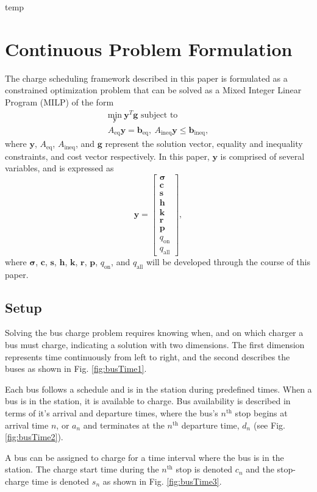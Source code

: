 \newpage temp \newpage
\section{Continuous Problem Formulation}
The charge scheduling framework described in this paper is formulated as a constrained optimization problem that can be solved as a Mixed Integer Linear Program (MILP) of the form
\begin{equation}\begin{matrix}
	\underset{\mathbf{y}}{\text{min}} \ \mathbf{y}^T\mathbf{g} \text{ subject to } \\
	A_{\text{eq}}\mathbf{y} = \mathbf{b}_{\text{eq}}, \ A_{\text{ineq}}\mathbf{y} \le \mathbf{b}_{\text{ineq}},
\end{matrix} \end{equation}
where $\mathbf{y}$, $A_{\text{eq}}$, $A_{\text{ineq}}$, and $\mathbf{g}$ represent the solution vector, equality and inequality constraints, and cost vector respectively. In this paper, $\mathbf{y}$ is comprised of several variables, and is expressed as 
\begin{equation}
	\mathbf{y} = \begin{bmatrix}\mathbf{\sigma} \\ \mathbf{c} \\ \mathbf{s} \\ \mathbf{h} \\ \mathbf{k} \\ \mathbf{r} \\ \mathbf{p} \\ q_{\text{on}} \\ q_{\text{all}}\end{bmatrix},
\end{equation}
where $\mathbf{\sigma}$, $\mathbf{c}$, $\mathbf{s}$, $\mathbf{h}$, $\mathbf{k}$, $\mathbf{r}$, $\mathbf{p}$, $q_{\text{on}}$, and $q_{\text{all}}$ will be developed through the course of this paper.
\subsection{Setup}
\par Solving the bus charge problem requires knowing when, and on which charger a bus must charge, indicating a solution with two dimensions.  The first dimension represents time continuously from left to right, and the second describes the buses as shown in Fig. \ref{fig:busTime1}.

\par Each bus follows a schedule and is in the station during predefined times. When a bus is in the station, it is available to charge.  Bus availability is described in terms of it's arrival and departure times, where the bus's $n^{\text{th}}$ stop begins at arrival time $n$, or $a_n$ and terminates at the $n^{\text{th}}$ departure time, $d_n$ (see Fig. \ref{fig:busTime2}). 

\par A bus can be assigned to charge for a time interval where the bus is in the station. The charge start time during the $n^{\text{th}}$ stop is denoted $c_n$ and the stop-charge time is denoted $s_n$ as shown in Fig. \ref{fig:busTime3}. 

